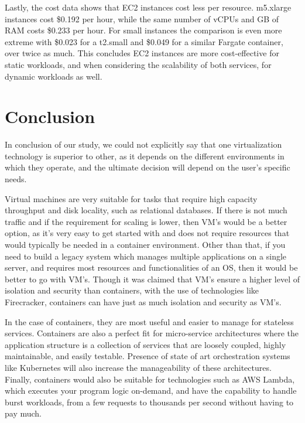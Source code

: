 \documentclass[11pt]{article}
\begin{document}
Lastly, the cost data shows that EC2 instances cost less per resource. m5.xlarge instances cost \$0.192 per hour, while the same number of vCPUs and GB of RAM costs \$0.233 per hour. For small instances the comparison is even more extreme with \$0.023 for a t2.small and \$0.049 for a similar Fargate container, over twice as much. This concludes EC2 instances are more cost-effective for static workloads, and when considering the scalability of both services, for dynamic workloads as well.

\vspace{3mm} %


\section{Conclusion}

In conclusion of our study, we could not explicitly say that one virtualization technology is superior to other, as it depends on the different environments in which they operate, and the ultimate decision will depend on the user's specific needs. 

Virtual machines are very suitable for tasks that require high capacity throughput and disk locality, such as relational databases. If there is not much traffic and if the requirement for scaling is lower, then VM's would be a better option, as it's very easy to get started with and does not require resources that would typically be needed in a container environment. Other than that, if you need to build a legacy system which manages multiple applications on a single server, and requires most resources and functionalities of an OS, then it would be better to go with VM's. Though it was claimed that VM's ensure a higher level of isolation and security than containers, with the use of technologies like Firecracker, containers can have just as much isolation and security as VM's.

In the case of containers, they are most useful and easier to manage for stateless services. Containers are also a perfect fit for micro-service architectures where the application structure is a collection of services that are loosely coupled, highly maintainable, and easily testable. Presence of state of art orchestration systems like Kubernetes will also increase the manageability of these architectures. Finally, containers would also be suitable for technologies such as AWS Lambda, which executes your program logic on-demand, and have the capability to handle burst workloads, from a few requests to thousands per second without having to pay much.
\end{document}
